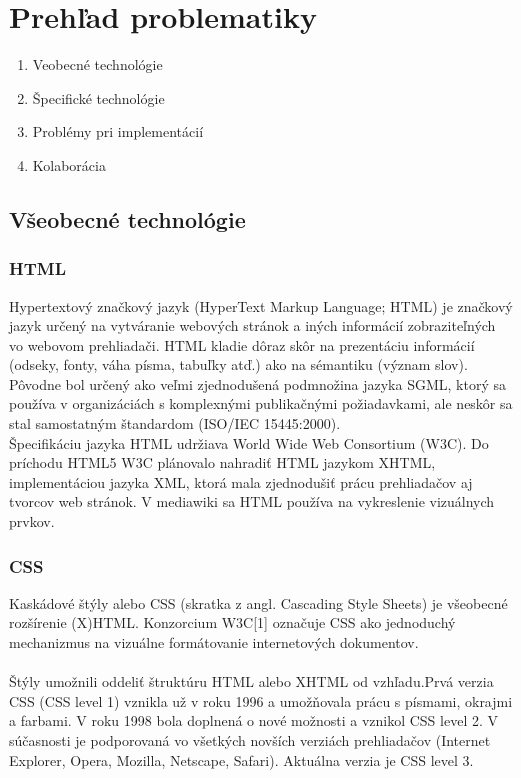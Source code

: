 \chapter{Prehľad problematiky}\label{chap:issues_overview}

\begin{enumerate}
	\item Veobecné technológie
	\item Špecifické technológie
	\item Problémy pri implementácií
	\item Kolaborácia
	
\end{enumerate}

\section{Všeobecné technológie}
\subsection{HTML}

Hypertextový značkový jazyk (HyperText Markup Language; HTML) je značkový jazyk určený na vytváranie webových stránok a iných informácií zobraziteľných vo webovom prehliadači. HTML kladie dôraz skôr na prezentáciu informácií (odseky, fonty, váha písma, tabuľky atď.) ako na sémantiku (význam slov).
Pôvodne bol určený ako veľmi zjednodušená podmnožina jazyka SGML, ktorý sa používa v organizáciách s komplexnými publikačnými požiadavkami, ale neskôr sa stal samostatným štandardom (ISO/IEC 15445:2000).\\
Špecifikáciu jazyka HTML udržiava World Wide Web Consortium (W3C).
Do príchodu HTML5 W3C plánovalo nahradiť HTML jazykom XHTML, implementáciou jazyka XML, ktorá mala zjednodušiť prácu prehliadačov aj tvorcov web stránok.
V mediawiki sa HTML používa na vykreslenie vizuálnych prvkov.

\subsection{CSS}
Kaskádové štýly alebo CSS (skratka z angl. Cascading Style Sheets) je všeobecné rozšírenie (X)HTML. Konzorcium W3C[1] označuje CSS ako jednoduchý mechanizmus na vizuálne formátovanie internetových dokumentov.\\
\\
Štýly umožnili oddeliť štruktúru HTML alebo XHTML od vzhľadu.Prvá verzia CSS (CSS level 1) vznikla už v roku 1996 a umožňovala prácu s písmami, okrajmi a farbami. V roku 1998 bola doplnená o nové možnosti a vznikol CSS level 2. V súčasnosti je podporovaná vo všetkých novších verziách prehliadačov (Internet Explorer, Opera, Mozilla, Netscape, Safari). Aktuálna verzia je CSS level 3.
